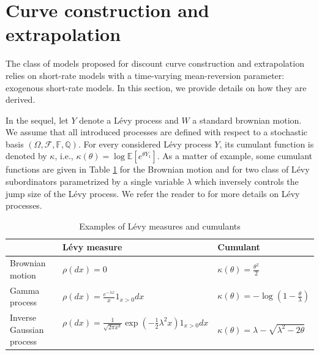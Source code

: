 \nocite{cousin2014}

\section{Curve construction and extrapolation}
\label{curveconstruction}

The class of models proposed for discount curve construction and extrapolation relies on short-rate models with a time-varying mean-reversion parameter: exogenous short-rate models. In this section, we provide details on how they are derived. 

\medskip

In the sequel, let $Y$ denote a  L{\'e}vy process and $W$ a standard brownian motion. We assume that all introduced processes are defined with respect to a stochastic basis $(\Omega,\mathcal{F},\mathbb{F},\mathbb{Q})$. 
For every considered  L{\'e}vy process $Y$, its cumulant function is denoted by $\kappa$, i.e., $\kappa(\theta)=\log\mathbb{E}\left[e^{\theta Y_1}\right]$. 
As a matter of example, some cumulant functions are given in Table \ref{Table:Levy} for the Brownian motion and for two class of L{\'e}vy subordinators parametrized by a single variable $\lambda$ which inversely controls the jump size of the L\'evy process. We refer the reader to \cite{tankov2003financial} for more details on L\'evy processes. 	
\begin{table}[h]	
\begin{center}
{\renewcommand{\arraystretch}{1.8}
\begin{tabular}{|l|l|l|}
\cline{2-3} \multicolumn{1}{c|}{}  & L{\'e}vy measure   & Cumulant \\
		\hline
		 Brownian motion &  $\rho(dx)=0 $ &  $\kappa(\theta)=\frac{\theta^2}{2}$  \\

		\hline
		 Gamma process &  $\rho(dx)=\frac{e^{-\lambda x}}{x}1_{x>0}dx$ &  $\kappa(\theta)=-\log\left(1- \frac{\theta}{\lambda}\right)$  \\
		 \hline
		 Inverse Gaussian process&   $\rho(dx)=\frac{1}{\sqrt{2 \pi x^3}}\exp\left(-\frac{1}{2} \lambda^2 x \right)1_{{x>0}}dx$\ & $\kappa(\theta)= \lambda-\sqrt{\lambda^2-2\theta}$   \\
		 \hline
		\end{tabular}
		}
\end{center}
\caption{Examples of L\'evy measures and cumulants}
\label{Table:Levy}	
\end{table}
